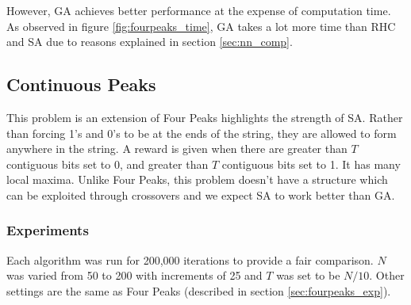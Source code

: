 \documentclass[letterpaper]{article}
\begin{document}
	However, GA achieves better performance at the expense of computation time. As observed in figure \ref{fig:fourpeaks_time}, GA takes a lot more time than RHC and SA due to reasons explained in section \ref{sec:nn_comp}.
	
	\subsection{Continuous Peaks}
	This problem is an extension of Four Peaks highlights the strength of SA. Rather than forcing 1's and 0's to be at the ends of the string, they are allowed to form anywhere in the string. A reward is given when there are greater than $T$ contiguous bits set to 0, and greater than $T$ contiguous bits set to 1. It has many local maxima. Unlike Four Peaks, this problem doesn't have a structure which can be exploited through crossovers and we expect SA to work better than GA.
	
	\subsubsection{Experiments}
	Each algorithm was run for 200,000 iterations to provide a fair comparison. $N$ was varied from 50 to 200 with increments of 25 and $T$ was set to be $N/10$. Other settings are the same as Four Peaks (described in section \ref{sec:fourpeaks_exp}).
	
\end{document}
